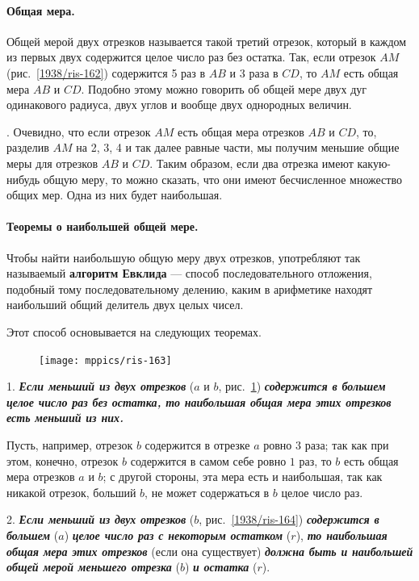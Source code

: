 \documentclass[twoside]{book}
\makeatletter
\newcommand{\rindex}[2][\imki@jobname]{%
  \index[#1]{\detokenize{#2}}%
}
\makeatother
\begin{document}
\paragraph{Общая мера.}\label{1938/145}
Общей мерой двух отрезков называется такой третий отрезок, который в каждом из первых двух содержится целое число раз без остатка.
Так, если отрезок $AM$ (рис.~\ref{1938/ris-162}) содержится 5 раз в $AB$ и 3 раза в $CD$, то $AM$ есть общая мера $AB$ и $CD$.
Подобно этому можно говорить об общей мере двух дуг одинакового радиуса, двух углов и вообще двух однородных величин.

\smallskip
{}.
Очевидно, что если отрезок $AM$ есть общая мера
отрезков $AB$ и $CD$, то, разделив $AM$ на 2, 3, 4 и так далее равные
части, мы получим меньшие общие меры для отрезков $AB$ и $CD$.
Таким образом, если два отрезка имеют какую-нибудь общую меру, то можно сказать, что они имеют бесчисленное множество общих мер.
Одна из них будет наибольшая.

\paragraph{Теоремы о наибольшей общей мере.}\label{1938/146}
Чтобы найти наибольшую общую меру двух отрезков, употребляют так называемый \rindex{алгоритм Евклида}\textbf{алгоритм Евклида} — способ последовательного отложения, подобный тому последовательному делению, каким в арифметике находят наибольший общий делитель двух целых чисел. 

Этот способ основывается на следующих теоремах.

\begin{figure}
\centering
\texttt{[image: mppics/ris-163]}
\caption{}\label{1938/ris-163}
\end{figure}

1.
\textbf{\emph{Если меньший из двух отрезков}} ($a$ и $b$, рис.~\ref{1938/ris-163}) \textbf{\emph{содержится в большем целое число раз без остатка, то наибольшая общая мера этих отрезков есть меньший из них.}}

Пусть, например, отрезок $b$ содержится в отрезке $a$ ровно $3$ раза;
так как при этом, конечно, отрезок $b$ содержится в самом себе ровно $1$ раз, то $b$ есть общая мера отрезков $a$ и $b$;
с другой стороны, эта мера есть и наибольшая, так как никакой отрезок, больший $b$, не может содержаться в $b$ целое число раз.

2.
\textbf{\emph{Если меньший из двух отрезков}} ($b$, рис.~\ref{1938/ris-164}) \textbf{\emph{содержится в большем}} ($a$) \textbf{\emph{целое число раз с некоторым остатком}} ($r$), \textbf{\emph{то наибольшая общая мера этих отрезков}} (если она существует) \textbf{\emph{должна быть и наибольшей общей мерой меньшего отрезка}} ($b$) \textbf{\emph{и остатка}} ($r$).
\end{document}
